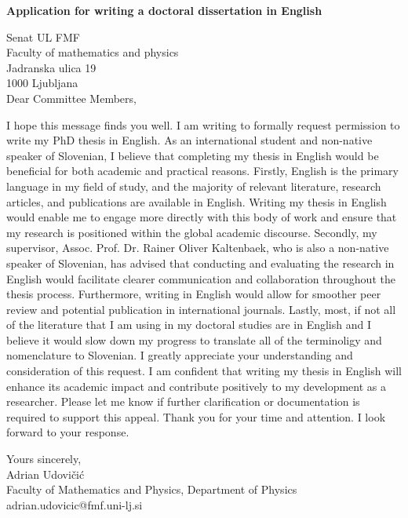 \documentclass{article}
\theoremstyle{mytheoremstyle}
\theoremstyle{mytheoremstyle}
\theoremstyle{myproblemstyle}
\begin{document}
\clearpage
\pagestyle{plain}

\begin{center}
	\textbf{Application for writing a doctoral dissertation in English}\\
\end{center}

\noindent Senat UL FMF\\
Faculty of mathematics and physics\\
Jadranska ulica 19\\
1000 Ljubljana\\

\vspace{1cm} %
Dear Committee Members,
\vspace{1cm}

I hope this message finds you well. I am writing to formally request permission to write my PhD thesis in English.
As an international student and non-native speaker of Slovenian, I believe that completing my thesis in English would be beneficial for both academic and practical reasons.
Firstly, English is the primary language in my field of study, and the majority of relevant literature, research articles, and publications are available in English.
Writing my thesis in English would enable me to engage more directly with this body of work and ensure that my research is positioned within the global academic discourse.
Secondly, my supervisor, Assoc. Prof. Dr. Rainer Oliver Kaltenbaek, who is also a non-native speaker of Slovenian, has advised that conducting and evaluating the research in
English would facilitate clearer communication and collaboration throughout the thesis process. Furthermore, writing in English would allow for smoother peer review
and potential publication in international journals.
Lastly, most, if not all of the literature that I am using in my doctoral studies are in English and I believe it would slow down my progress to translate
all of the terminoligy and nomenclature to Slovenian.
I greatly appreciate your understanding and consideration of this request. I am confident that writing my thesis in English will enhance its academic
impact and contribute positively to my development as a researcher. Please let me know if further clarification or documentation is required to support this appeal.
Thank you for your time and attention. I look forward to your response.

\vspace{1cm}
Yours sincerely,\\
Adrian Udovičić\\
Faculty of Mathematics and Physics, Department of Physics\\
adrian.udovicic@fmf.uni-lj.si
\end{document}
